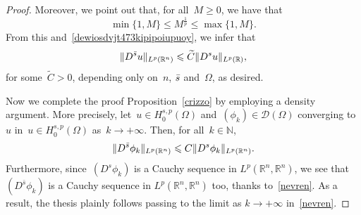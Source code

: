 \documentclass[10pt,a4paper]{amsart}
\newcommand{\N}{\mathbb{N}}
\newcommand{\R}{\mathbb{R}}
\newcommand{\bs}{\Bar{s}}
\renewcommand{\ge}{\geqslant}
\renewcommand{\le}{\leqslant}
\renewcommand{\leq}{\leqslant}
\begin{document}
\begin{proof}
Moreover, we point out that, for all~$M\ge0$, we have that
$$\min\{1,M\}\le M^{\frac1p}\le \max\{1,M\}.$$
{F}rom this and~\eqref{dewiosdvjt473kipipoiupuoy}, we infer that
$$ \Vert D^{\bs} u \Vert_{L^p(\R^n)}\le \widetilde C\Vert D^s u \Vert_{L^p(\R)},$$
for some~$\widetilde C>0$, depending only on~$n$, $\bs$ and~$\Omega$, as desired.
					
{N}ow we complete the proof Proposition~\ref{crizzo} by
employing a density argument. More precisely, let~$u \in H^{s,p}_0(\Omega)$ and~$(\phi_k)\in\mathcal{D}(\Omega)$ converging to~$u$ in~$u \in H^{s,p}_0(\Omega)$ as~$k\to+\infty$. Then, for all~$k\in\N$,
\begin{equation}\label{nevren}
				\Vert D^{\bs}\phi_k \Vert_{L^p(\R^n)} \leq C \Vert D^s \phi_k \Vert_{L^p(\R^n)}. 
\end{equation}
Furthermore, since~$(D^s \phi_k)$ is a Cauchy sequence in $L^p(\R^n, \R^n)$, we see that $(D^{\bar{s}}\phi_k)$ is a Cauchy sequence in $L^p(\R^n, \R^n)$ too,
thanks to~\eqref{nevren}.
As a result, the thesis plainly follows passing to the limit as $k \to +\infty$ in~\eqref{nevren}.
\end{proof}
\end{document}
